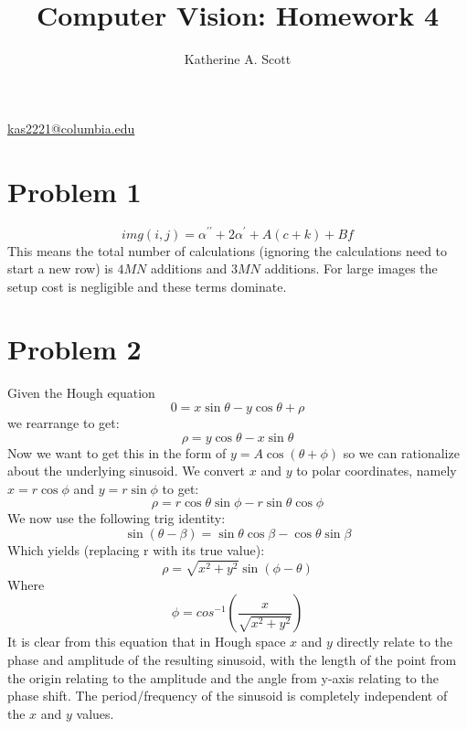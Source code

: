 \documentclass{article}
\begin{document}
\title{Computer Vision: Homework 4}

\author{Katherine A. Scott}
\maketitle
\mbox{}
\begin{center}
\href{mailto:katherineAScott@gmail.com}{kas2221@columbia.edu}

\end{center}
\section{Problem 1}

 \[
img(i,j)=\alpha^{\prime\prime} +2\alpha^{\prime} + A(c+k)+Bf 
\]
This means the total number of calculations (ignoring the calculations need to start a new row) is $4MN$ additions and $3MN$ additions. For large images the setup cost is negligible and these terms dominate. 
\section{Problem 2}
Given the Hough equation 
\[
0 = x\sin{\theta}-y\cos{\theta}+\rho
\]
we rearrange to get:
\[
\rho = y\cos{\theta} - x\sin{\theta}
\]
Now we want to get this in the form of $y=A\cos{(\theta+\phi)}$ so we can rationalize about the underlying sinusoid. We convert $x$ and $y$ to polar coordinates, namely $x=r\cos{\phi}$ and $y=r\sin{\phi}$ to get:
\[
\rho = r \cos{\theta}\sin{\phi}-r\sin{\theta}\cos{\phi}
\]
We now use the following trig identity:
\[
\sin{(\theta-\beta)}=\sin{\theta}\cos{\beta}-\cos{\theta}\sin{\beta}
\]
Which yields (replacing r with its true value):
\[
\rho = \sqrt{x^{2}+y^{2}}
\sin{(\phi-\theta)}
\]
Where
\[
\phi = cos^{-1}{(\frac{x}{\sqrt{x^{2}+y^{2}}})}
\]
It is clear from this equation that in Hough space $x$ and $y$ directly relate to the phase and amplitude of the resulting sinusoid, with the length of the point from the origin relating to the amplitude and the angle from y-axis relating to the phase shift. The period/frequency of the sinusoid is completely independent of the $x$ and $y$ values.
\end{document}

